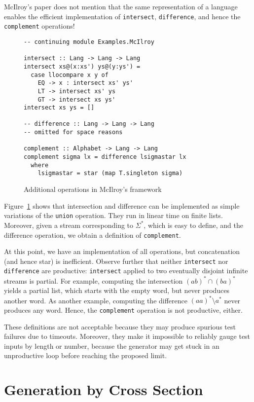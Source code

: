 McIlroy's paper does not mention that the same representation of a
language enables the efficient implementation of
\lstinline{intersect}, \lstinline{difference}, and hence the
\lstinline{complement} operations!

\begin{figure}[tp]
\begin{lstlisting}
-- continuing module Examples.McIlroy

intersect :: Lang -> Lang -> Lang
intersect xs@(x:xs') ys@(y:ys') =
  case llocompare x y of
    EQ -> x : intersect xs' ys'
    LT -> intersect xs' ys
    GT -> intersect xs ys'
intersect xs ys = []

-- difference :: Lang -> Lang -> Lang
-- omitted for space reasons

complement :: Alphabet -> Lang -> Lang
complement sigma lx = difference lsigmastar lx
  where
    lsigmastar = star (map T.singleton sigma)
\end{lstlisting}
  \caption{Additional operations in McIlroy's framework}
  \label{fig:more-regular-operators}
\end{figure}
Figure~\ref{fig:more-regular-operators} shows that intersection and difference can be
implemented as simple variations of the \lstinline{union} operation. They run in linear
time on finite lists. Moreover, given a stream corresponding to $\Sigma^*$, which is easy
to define, and the difference operation, we obtain a definition of \lstinline{complement}.

At this point, we have an implementation of all 
operations, but concatenation (and hence star) is
inefficient. Observe further that neither \lstinline{intersect} nor
\lstinline{difference} are productive:
\lstinline{intersect} applied to two eventually disjoint infinite
streams is partial. For example, computing the intersection
$(ab)^* \cap (ba)^*$ yields a partial list, which starts with the
empty word, but never produces another word. As another example,
computing the difference $(aa)^* \setminus a^*$ never produces any
word.  Hence, the \lstinline{complement} operation is not
productive, either.

These definitions are not acceptable because they may produce
spurious test failures due to timeouts. Moreover, they make it
impossible to reliably gauge test inputs by length or number, 
because the generator may get stuck in an unproductive loop before
reaching the proposed limit.

\section{Generation by Cross Section}
\label{sec:gener-cross-sect}

